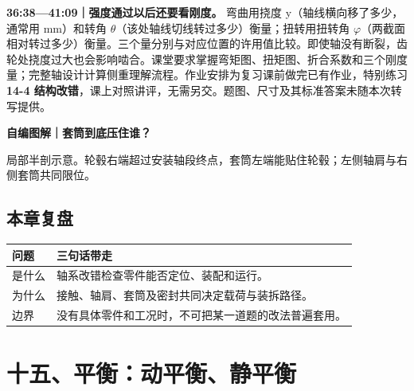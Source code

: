 \documentclass[zihao=5,a4paper,UTF8,fontset=fandol]{ctexart}
\begin{document}
\textbf{36:38—41:09｜强度通过以后还要看刚度。} 弯曲用挠度 y（轴线横向移了多少，通常用 mm）和转角 $\theta$（该处轴线切线转过多少）衡量；扭转用扭转角 $\varphi$（两截面相对转过多少）衡量。三个量分别与对应位置的许用值比较。即使轴没有断裂，齿轮处挠度过大也会影响啮合。课堂要求掌握弯矩图、扭矩图、折合系数和三个刚度量；完整轴设计计算侧重理解流程。作业安排为复习课前做完已有作业，特别练习 \textbf{14-4 结构改错}，课上对照讲评，无需另交。题图、尺寸及其标准答案未随本次转写提供。


\textbf{自编图解｜套筒到底压住谁？}


\begin{center}\end{center}


局部半剖示意。轮毂右端超过安装轴段终点，套筒左端能贴住轮毂；左侧轴肩与右侧套筒共同限位。




\subsection{本章复盘}

\begin{longtable}{p{7.51cm}p{7.51cm}}
\toprule
问题 & 三句话带走 \\

\midrule
\endhead
是什么 & 轴系改错检查零件能否定位、装配和运行。 \\
为什么 & 接触、轴肩、套筒及密封共同决定载荷与装拆路径。 \\
边界 & 没有具体零件和工况时，不可把某一道题的改法普遍套用。 \\
\bottomrule
\end{longtable}



\section{十五、平衡：动平衡、静平衡}
\end{document}
